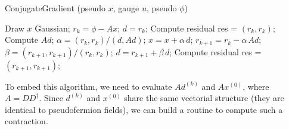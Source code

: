 \begin{algorithm}
\caption{ConjugateGradient (pseudo $x$, gauge $u$, pseudo $\phi$)}\label{alg:cap}
\begin{algorithmic}
\State Draw $x$ Gaussian;
\State $r_k = \phi - Ax$;
\State $d = r_k$;
\State Compute residual res = $(r_k, r_k)$;
\State Compute $Ad$;
\State $\alpha = (r_k, r_k)/(d, Ad)$;
\State $x = x + \alpha \, d$;
\State $r_{k+1} = r_k - \alpha \, Ad$;
\State $\beta = (r_{k+1}, r_{k+1})/(r_k, r_k)$;
\State $d = r_{k+1} + \beta\,d $;
\State Compute residual res = $(r_{k+1}, r_{k+1})$;
\EndWhile
\end{algorithmic}
\end{algorithm}
To embed this algorithm, we need to evaluate $A d^{(k)}$ and $A x^{(0)}$, where $A = DD^{\dagger}$. Since $d^{(k)}$ and $x^{(0)}$ share the same vectorial structure (they are identical to pseudofermion fields), we can build a routine to compute such a contraction.
